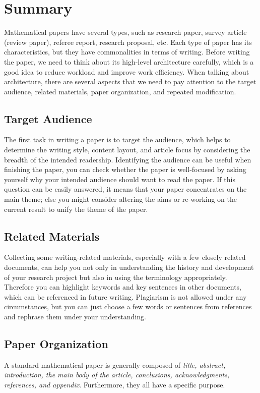 \section{Summary}
Mathematical papers have several types, such as research paper, survey article (review paper), referee report, research proposal, etc. Each type of paper has its characteristics, but they have commonalities in terms of writing. Before writing the paper, we need to think about its high-level architecture carefully, which is a good idea to reduce workload and improve work efficiency. When talking about architecture, there are several aspects that we need to pay attention to the target audience, related materials, paper organization, and repeated modification.


\subsection{Target Audience}
The first task in writing a paper is to target the audience, which helps to determine the writing style, content layout, and article focus by considering the breadth of the intended readership. Identifying the audience can be useful when finishing the paper, you can check whether the paper is well-focused by asking yourself why your intended audience should want to read the paper. If this question can be easily answered, it means that your paper concentrates on the main theme; else you might consider altering the aims or re-working on the current result to unify the theme of the paper.


\subsection{Related Materials}
Collecting some writing-related materials, especially with a few closely related documents, can help you not only in understanding the history and development of your research project but also in using the terminology appropriately. Therefore you can highlight keywords and key sentences in other documents, which can be referenced in future writing. Plagiarism is not allowed under any circumstances, but you can just choose a few words or sentences from references and rephrase them under your understanding.


\subsection{Paper Organization}
A standard mathematical paper is generally composed of \emph{title, abstract, introduction, the main body of the article, conclusions, acknowledgments, references, and appendix}. Furthermore, they all have a specific purpose.
